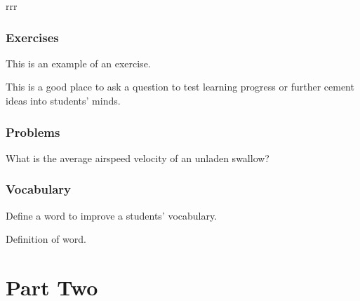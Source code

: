 \documentclass[11pt,twoside]{book} %
\begin{document}
\begin{example}
    rrr
\end{example}


\section{Exercises}

This is an example of an exercise.

\begin{exercise}
    This is a good place to ask a question to test learning progress or further cement ideas into students' minds.
\end{exercise}


\section{Problems}

\begin{problem}
What is the average airspeed velocity of an unladen swallow?
\end{problem}


\section{Vocabulary}

Define a word to improve a students' vocabulary.

\begin{vocabulary}[Word]
    Definition of word.
\end{vocabulary}


\part{Part Two}

\end{document}
